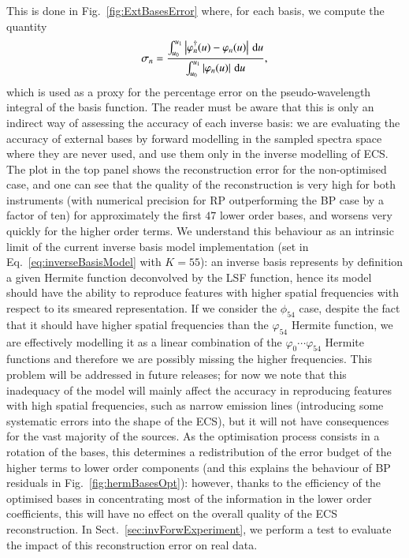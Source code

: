 \documentclass{aa}
\newcommand{\wrt}{with respect to\xspace}
\newcommand{\secname}{Sect.}
\newcommand{\equref}[1]{Eq.~\ref{eq:#1}}
\newcommand{\secref}[1]{\secname~\ref{sec:#1}}
\newcommand{\figref}[1]{Fig.~\ref{fig:#1}}
\begin{document}
This is done in \figref{ExtBasesError} where, for each basis, we compute the quantity
\begin{equation}
    \sigma_n = \frac{\int_{u_0}^{u_1} \left|\varphi_n^\dagger(u)-\varphi_n(u)\right| \,{\rm d} u}{\int_{u_0}^{u_1} \left|\varphi_n(u)\right| \,{\rm d}u}
,\end{equation}
which is used as a proxy for the percentage error on the pseudo-wavelength integral of the basis function.
The reader must be aware that this is only an indirect way of assessing the accuracy of each inverse basis: we are evaluating the accuracy of external bases by forward modelling in the sampled spectra space where they are never used, and use them only in the inverse modelling of ECS. 
The plot in the top panel shows the reconstruction error for the non-optimised case, and one can see that the quality of the reconstruction is very high for both instruments (with numerical precision for RP outperforming the BP case by a factor of ten) for approximately the first  $47$ lower order bases,  and worsens very quickly for the higher order terms. We understand this behaviour as an intrinsic limit of the current inverse basis model  implementation (set in \equref{inverseBasisModel} with $K=55$): an inverse basis represents by definition a given Hermite function deconvolved by the LSF function, hence its model should have the ability to reproduce features with higher spatial frequencies \wrt its smeared representation. If we consider the $\phi_{54}$ case, despite the fact that it should have higher spatial frequencies than the  $\varphi_{54}$ Hermite function, we are effectively modelling it as a linear combination of the 
 $\varphi_0\cdots\varphi_{54}$ Hermite functions and therefore we are possibly missing the higher frequencies. 
This problem will be addressed in future releases; for now we note that this inadequacy of the model will mainly affect the accuracy in reproducing  
features with high spatial frequencies, such as narrow emission lines (introducing some systematic errors into the shape of the ECS), but it will not have consequences for the vast majority of the sources. As the optimisation process  consists in a rotation of the bases, this determines a redistribution of the error budget of the  higher
terms to lower order components (and this explains the behaviour of BP residuals in \figref{hermBasesOpt}): however, thanks to the efficiency of the optimised bases in concentrating most of the information in the lower order coefficients, this will have no effect on the overall quality of the ECS reconstruction.
In \secref{invForwExperiment}, we perform a test to evaluate the impact of this reconstruction error on real data.
\end{document}
